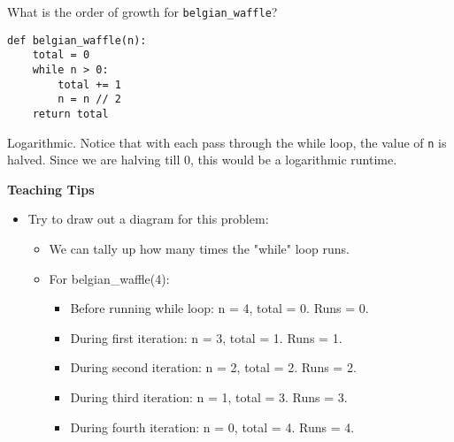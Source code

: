 \begin{blocksection}
\question What is the order of growth for \lstinline{belgian_waffle}? \\
\begin{lstlisting}
def belgian_waffle(n):
    total = 0
    while n > 0:
        total += 1
        n = n // 2
    return total
\end{lstlisting}

\begin{solution}
Logarithmic. Notice that with each pass through the while loop, the value of \lstinline{n} is halved. Since we are halving till 0, this would be a logarithmic runtime.
\end{solution}

\begin{guide}
    \textbf{Teaching Tips}
    \begin{itemize}
       \item Try to draw out a diagram for this problem:
       \begin{itemize}
            \item We can tally up how many times the "while" loop runs. 
            \item For belgian\_waffle(4):
            \begin{itemize}
                \item Before running while loop: n = 4, total = 0. Runs = 0.
                \item During first iteration: n = 3, total = 1. Runs = 1.
                \item During second iteration: n = 2, total = 2. Runs = 2.
                \item During third iteration: n = 1, total = 3. Runs = 3.
                \item During fourth iteration: n = 0, total = 4. Runs = 4.
            \end{itemize}
       \end{itemize}
    \end{itemize}
 \end{guide}

\end{blocksection}